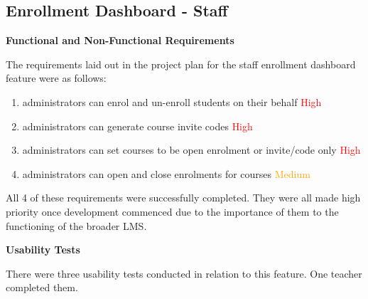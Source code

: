 \subsection{Enrollment Dashboard - Staff}
\textbf{Functional and Non-Functional Requirements}

The requirements laid out in the project plan for the staff enrollment dashboard feature were as follows:
    \begin{enumerate}
    \item administrators can enrol and un-enroll students on their behalf \textcolor{Red}{High}
    \item administrators can generate course invite codes \textcolor{Red}{High}
    \item administrators can set courses to be open enrolment or invite/code only \textcolor{Red}{High}
    \item administrators can open and close enrolments for courses \textcolor{Orange}{Medium}
    \end{enumerate}
All 4 of these requirements were successfully completed. They were all made high priority once development commenced due to the importance of them to the functioning of the broader LMS.

\textbf{Usability Tests}

There were three usability tests conducted in relation to this feature. One teacher completed them.

